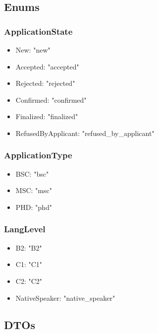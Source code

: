 \subsection{Enums}

\subsubsection{ApplicationState}
\begin{itemize}
    \item New: "new"
    \item Accepted: "accepted"
    \item Rejected: "rejected"
    \item Confirmed: "confirmed"
    \item Finalized: "finalized"
    \item RefusedByApplicant: "refused\_by\_applicant"
\end{itemize}


\subsubsection{ApplicationType}
\begin{itemize}
    \item BSC: "bsc"
    \item MSC: "msc"
    \item PHD: "phd"
\end{itemize}


\subsubsection{LangLevel}
\begin{itemize}
    \item B2: "B2"
    \item C1: "C1"
    \item C2: "C2"
    \item NativeSpeaker: "native\_speaker"
\end{itemize}

\subsection{DTOs}
